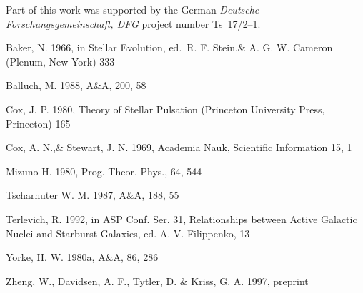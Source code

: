 \documentclass{aa}
\begin{document}
\begin{acknowledgements}
      Part of this work was supported by the German
      \emph{Deut\-sche For\-schungs\-ge\-mein\-schaft, DFG\/} project
      number Ts~17/2--1.
\end{acknowledgements}



\begin{thebibliography}{}

   Baker, N. 1966,
      in Stellar Evolution,
      ed.\ R. F. Stein,\& A. G. W. Cameron
      (Plenum, New York) 333

    Balluch, M. 1988,
      A\&A, 200, 58

    Cox, J. P. 1980,
      Theory of Stellar Pulsation
      (Princeton University Press, Princeton) 165

    Cox, A. N.,\& Stewart, J. N. 1969,
      Academia Nauk, Scientific Information 15, 1

    Mizuno H. 1980,
      Prog. Theor. Phys., 64, 544
   
    Tscharnuter W. M. 1987,
      A\&A, 188, 55
  
    Terlevich, R. 1992, in ASP Conf. Ser. 31, 
      Relationships between Active Galactic Nuclei and Starburst Galaxies, 
      ed. A. V. Filippenko, 13

    Yorke, H. W. 1980a,
      A\&A, 86, 286

    Zheng, W., Davidsen, A. F., Tytler, D. \& Kriss, G. A.
      1997, preprint
\end{thebibliography}
\end{document}
